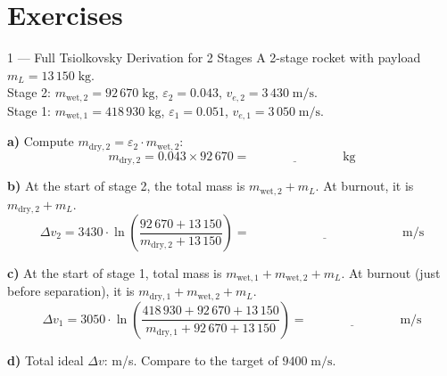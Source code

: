 \documentclass[12pt, a4paper]{article}
\begin{document}
\section{Exercises}

\begin{exercisebox}{1 — Full Tsiolkovsky Derivation for 2 Stages}
A 2-stage rocket with payload $m_L = 13\,150\;\text{kg}$.\\
Stage 2: $m_{\text{wet},2} = 92\,670\;\text{kg}$, $\varepsilon_2 = 0.043$, $v_{e,2} = 3\,430\;\text{m/s}$.\\
Stage 1: $m_{\text{wet},1} = 418\,930\;\text{kg}$, $\varepsilon_1 = 0.051$, $v_{e,1} = 3\,050\;\text{m/s}$.

\textbf{a)} Compute $m_{\text{dry},2} = \varepsilon_2 \cdot m_{\text{wet},2}$:
\[
  m_{\text{dry},2} = 0.043 \times 92\,670 = \underline{\hspace{3cm}}\;\text{kg}
\]

\textbf{b)} At the start of stage 2, the total mass is $m_{\text{wet},2} + m_L$. At burnout, it is $m_{\text{dry},2} + m_L$.
\[
  \Delta v_2 = 3430\cdot\ln\!\left(\frac{92\,670 + 13\,150}{m_{\text{dry},2} + 13\,150}\right) = \underline{\hspace{5cm}}\;\text{m/s}
\]

\textbf{c)} At the start of stage 1, total mass is $m_{\text{wet},1} + m_{\text{wet},2} + m_L$.
At burnout (just before separation), it is $m_{\text{dry},1} + m_{\text{wet},2} + m_L$.
\[
  \Delta v_1 = 3050\cdot\ln\!\left(\frac{418\,930 + 92\,670 + 13\,150}{m_{\text{dry},1} + 92\,670 + 13\,150}\right) = \underline{\hspace{3cm}}\;\text{m/s}
\]

\textbf{d)} Total ideal $\Delta v$: \underline{\hspace{3cm}} m/s. Compare to the target of $9400\;\text{m/s}$.
\end{exercisebox}

\begin{solutionspace}[10cm]
\end{solutionspace}
\end{document}

